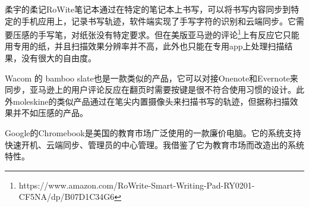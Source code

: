\documentclass{article}
\begin{document}
柔宇的柔记RoWite笔记本通过在特定的笔记本上书写，可以将书写内容同步到特定的手机应用上，记录书写轨迹，软件端实现了手写字符的识别和云端同步。它需要压感的手写笔，对纸张没有特定要求。但在美版亚马逊的评论\footnote{https://www.amazon.com/RoWrite-Smart-Writing-Pad-RY0201-CF5NA/dp/B07D1C34G6}上有反应它只能用专用的纸，并且扫描效果分辨率并不高，此外也只能在专用app上处理扫描结果，没有很大的自由度。

Wacom 的 bamboo slate也是一款类似的产品，它可以对接Onenote和Evernote来同步，亚马逊上的用户评论反应在翻页时需要按键是很不符合使用习惯的设计。此外moleskine的类似产品通过在笔尖内置摄像头来扫描书写的轨迹，但据称扫描效果并不如压感的产品。

Google的Chromebook是美国的教育市场广泛使用的一款廉价电脑。它的系统支持快速开机、云端同步、管理员的中心管理。我借鉴了它为教育市场而改造出的系统特性。
\end{document}
